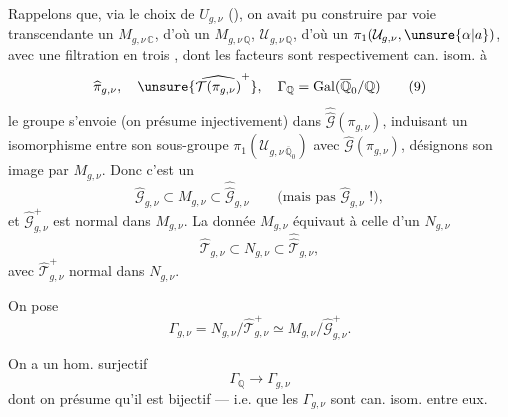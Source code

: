 
Rappelons que, via le choix de $U_{g,\nu}$ (), on avait pu construire par voie transcendante un $M_{g,\nu\,\mathbb C}$, d'où un $M_{g,\nu\,\mathbb Q}$,  $\mathcal U_{g,\nu\,\mathbb Q}$, d'où un $\pi_1(\mathcal U_{g,\nu},\unsure{\alpha|a})$, avec une filtration en trois , dont les facteurs sont respectivement can. isom. à
\[
\widehat{\pi}_{g,\nu},\quad
\unsure{\widehat{\mathcal T(\pi_{g,\nu})}^{+}},\quad
\Gamma_{\mathbb Q}=\mathrm{Gal}(\overline{\mathbb Q}_0/\mathbb Q)
\tag{9}
\]
le groupe s'envoie (on présume injectivement) dans $\widehat{\widehat{\mathcal G}}(\pi_{g,\nu})$,  induisant un isomorphisme entre son sous-groupe $\pi_1(\mathcal U_{g,\nu\,\overline{\mathbb Q}_0})$ avec $\widehat{\mathcal G}(\pi_{g,\nu})$, désignons son image par $M_{g,\nu}$. Donc c'est un  
\[
\widehat{\mathcal G}_{g,\nu}\subset M_{g,\nu}\subset\widehat{\widehat{\mathcal G}}_{g,\nu}
\qquad\text{(mais pas }\widehat{\mathcal G}_{g,\nu}\text{ !)},
\tag{10}
\]
et $\widehat{\mathcal G}_{g,\nu}^{+}$ est normal dans $M_{g,\nu}$. La donnée  $M_{g,\nu}$ équivaut à celle d'un $N_{g,\nu}$
\[
\widehat{\mathcal T}_{g,\nu}\subset N_{g,\nu}\subset\widehat{\widehat{\mathcal T}}_{g,\nu},
\tag{11}
\]
avec $\widehat{\mathcal T}_{g,\nu}^{+}$ normal dans $N_{g,\nu}$.

On pose
\[
\Gamma_{g,\nu}=N_{g,\nu}/\widehat{\mathcal T}_{g,\nu}^{+}\simeq M_{g,\nu}/\widehat{\mathcal G}_{g,\nu}^{+}.
\tag{12}
\]

On a un hom. surjectif
\[
\Gamma_{\mathbb Q}\longrightarrow\Gamma_{g,\nu}
\tag{13}
\]
dont on présume qu'il est bijectif --- i.e. que les $\Gamma_{g,\nu}$ sont can. isom. entre eux.



